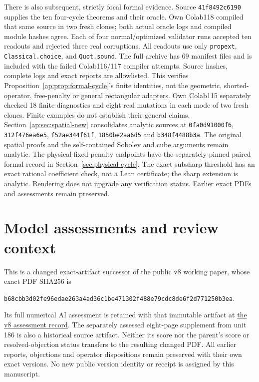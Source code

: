 \documentclass[11pt]{article}
\begin{document}
There is also subsequent, strictly focal formal evidence. Source
\texttt{41f8492c6190} supplies the ten four-cycle theorems and their oracle.
Own Colab118 compiled that same source in two fresh clones; both actual oracle logs
and compiled module hashes agree. Each of four normal/optimized validator runs
accepted ten readouts and rejected three real corruptions. All readouts use only
\texttt{propext}, \texttt{Classical.choice}, and \texttt{Quot.sound}.
The full archive has 69 manifest files and is included with the failed Colab116/117
compiler attempts. Source hashes, complete logs and exact reports are allowlisted.
This verifies Proposition~\ref{ap:prop:formal-cycle}'s finite identities, not the
geometric, shorted-operator, free-penalty or general rectangular adapters.
Own Colab115 separately checked 18 finite diagnostics and eight real mutations in
each mode of two fresh clones. Finite examples do not establish their general claims.
Section~\ref{ap:sec:spatial-new} consolidates analytic sources at
\texttt{0fa0d91000f6}, \texttt{312f476ea6e5}, \texttt{f52ae344f61f},
\texttt{1850be2aa6d5} and \texttt{b348f4488b3a}. The original spatial proofs and the self-contained Sobolev and cube
arguments remain analytic. The physical fixed-penalty endpoints have the
separately pinned paired formal record in Section~\ref{sec:physical-cycle}.
The exact subsharp threshold has an exact rational coefficient check, not a
Lean certificate; the sharp extension is analytic. Rendering does not upgrade
any verification status. Earlier exact PDFs and assessments remain preserved.

\section{Model assessments and review context}\label{sec:model-context}
This is a changed exact-artifact successor of the public v8 working paper,
whose exact PDF SHA256 is
\begin{center}\scriptsize\texttt{b68cbb3d02fe96edae263a4ad36c1be471302f488e79cdc8de6f2d771250b3ea}.\end{center}
Its full numerical AI assessment is retained with that immutable artifact at
\href{https://airr.science/papers/ARR-2026-7EPM3V3DP796BBRR/versions/v8/\#model-assessments}{the v8 assessment record}.
The separately assessed eight-page supplement from unit 186 is also a
historical source artifact. Neither its score nor the parent's score or
resolved-objection status transfers to the resulting changed PDF. All earlier
reports, objections and operator dispositions remain preserved with their
own exact versions. No new public version identity or receipt is assigned
by this manuscript.
\end{document}
